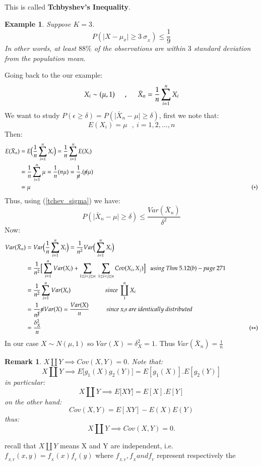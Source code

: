 \documentclass[14pt,twoside,a4paper,fleqn]{article}
\theoremstyle{plain}
\newtheorem{example}{Example}[section]
\newtheorem*{remark*}{Remark}
\begin{document}
This is called \textbf{Tchbyshev's Inequality}. 
\begin{example}
Suppose $K=3$.\hfill\newline
$$P(\vert X-\mu_x\vert \geq 3\ \sigma_{_X}) \leq \frac{1}{9}$$
In other words, at least $88\%$ of the observations are within $3$ standard deviation from the population mean.
\end{example}

Going back to the our example:
$$X_i \sim (\mu, 1)\tab[0.5cm],\tab[0.5cm] \bar X_n = \frac{1}{n}\sum_{i=1}^{n} X_i$$
We want to study $P(\epsilon \geq \delta) = P(\vert \bar{X}_n - \mu\vert \geq \delta)$, first we note that: $$E(X_i)=\mu\ \ \ ,\ i=1,2,\ldots,n$$
Then:
	\begin{equation*}
	\begin{split}
		E(\bar{X}_n) &= E\big(\frac{1}{n}\sum_{i=1}^{n}X_i \big)=\frac{1}{n}\sum_{i=1}^{n}E(X_i)\\
		&= \frac{1}{n}\sum_{i=1}^{n} \mu =\frac{1}{n}(n\mu)= \frac{1}{\cancel{n}}.(\cancel{n}\mu)\\
		&= \mu\tab[13cm] (*)
	\end{split}
	\end{equation*}
Thus, using (\ref{tchev_sigma}) we have:
	$$P(\vert\bar{X}_n - \mu\vert \geq \delta ) \leq \frac{Var(\bar{X}_n)}{\delta^2}$$
Now:
	\begin{equation*}
	\begin{split}
	Var(\bar{X}_n) &= Var\big(\frac{1}{n} \sum_{i=1}^{n} X_i \big) = \frac{1}{n^2}Var\big(\sum_{i=1}^{n}X_i \big)\\
	&=\frac{1}{n^2}\Big[\sum_{i=1}^{n} Var(X_i) +\sum_{1\leq i<j\leq n}\ \sum_{1\leq i<j\leq n} Cov(X_i, X_j) \Big]\ \ \ using\ Thm\ 5.12(b)-page\ 271\\
	&=\frac{1}{n^2}\sum_{i=1}^{n}Var(X_i)\tab[2cm]since\ \coprod_{1}^{n}X_i\\
	&=\frac{1}{n^{\cancel{2}}} \cancel{n} Var(X) = \frac{Var(X)}{n} \tab since\ x_{i}s\ are\ identically\ distributed\\
	&=\frac{\delta_X^2}{n}\tab[12cm](**)
	\end{split}
	\end{equation*}
	In our case $X\sim N(\mu, 1)$ so $Var(X) = \delta_X^2 = 1$. Thus $Var(\bar{X}_n) = \frac{1}{n}$
	
\begin{remark*}
$X\coprod Y \implies Cov(X,Y)=0$. Note that:
$$X \coprod Y \implies E\big[g_1(X)g_2(Y)\big] = E[g_1(X)].E[g_2(Y)]$$
in particular:
$$X \coprod Y \implies E\big[XY\big] = E[X].E[Y]$$
on the other hand:
$$Cov(X,Y) = E[XY] - E(X)E(Y)$$
thus: 
$$X\coprod Y\implies Cov(X,Y)=0.$$
\end{remark*}
recall that $X\coprod Y$ means X and Y are independent, i.e. \mbox{$f_{_{X,Y}}(x,y)=f_{_X}(x)f_{_Y}(y)$} where $f_{_{X,Y}},f_{_X} and f_{_Y}$ represent respectively the %
\end{document}
